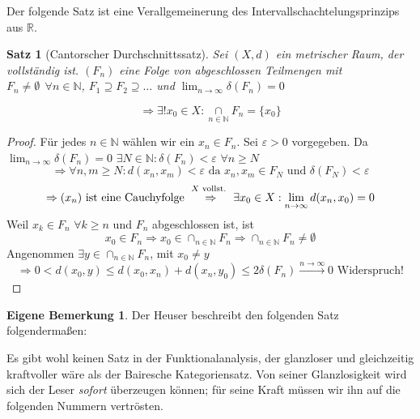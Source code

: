 \documentclass[ngerman]{report}
\theoremstyle{plain}%
\newtheorem{thm}{Satz}[chapter]
\theoremstyle{definition}%
\theoremstyle{myStyle}
\newtheorem*{mbem*}{Eigene Bemerkung}
\newcommand{\R}{\mathbb{R}}
\newcommand{\N}{\mathbb{N}}
\newcommand{\df}[1][]{%
	\overset{#1}{\Rightarrow}
}
\newcommand{\limes}[1][\infty]{\lim_{n \to #1}}
\begin{document}
Der folgende Satz ist eine Verallgemeinerung des Intervallschachtelungsprinzips aus $\R$.
\begin{thm}[Cantorscher Durchschnittssatz]
	Sei $(X,d)$ ein metrischer Raum, der vollständig ist. $(F_n)$ eine Folge von 		abgeschlossen Teilmengen mit $F_n \not = \emptyset\;\, \forall n\in\N$, 			$F_1\supseteq F_2\supseteq \dots$ und $\displaystyle \lim_{n\to\infty} \delta(F_n)=0$\par 
	$$\df \exists! x_0\in X: \underset{n\in\N}{\cap}F_n = \{x_0\}$$
\end{thm}
\begin{proof}
	Für jedes $n\in\N$ wählen wir ein $x_n\in F_n$. Sei $\varepsilon > 0$ vorgegeben. 
	Da $\displaystyle \lim_{n\to\infty} \delta(F_n)=0$ $\exists N\in\N:\delta(F_n)<\varepsilon$ $\forall n \geq N$
	$$\df \forall n,m\geq N: d(x_n,x_m)<\varepsilon \text{ da } x_n,x_m\in F_N \text{ und } \delta(F_N)<\varepsilon$$
	$$\df (x_n) \text{ ist eine Cauchyfolge } \overset{ X \text{ vollst. }}{\df} \exists x_0\in X : \limes d(x_n,x_0) = 0$$
	Weil $x_k\in F_n$  $\forall k \geq n$ und $F_n$ abgeschlossen ist, ist $$ x_0 \in F_n\df x_0 \in \cap_{n\in\N}F_n \df \cap_{n\in\N} F_n \not = \emptyset$$
	Angenommen $\exists y\in \cap_{n\in\N} F_n$, mit $x_0 \not= y$
	$$\df 0 < d(x_0,y) \leq d(x_0,x_n) + d(x_n,y_0) \leq 2\delta(F_n)\overset{n\to\infty}{\longrightarrow} 0 \text{  Widerspruch!}$$
\end{proof}

	\begin{mbem*}
		Der Heuser beschreibt den folgenden Satz folgendermaßen:\par  
		Es gibt wohl keinen Satz in der Funktionalanalysis, der glanzloser und gleichzeitig kraftvoller wäre als der Bairesche Kategoriensatz. Von seiner Glanzlosigkeit wird sich der Leser \textit{sofort} überzeugen können; für seine Kraft müssen wir ihn auf die folgenden Nummern vertrösten.
	\end{mbem*}
\end{document}
